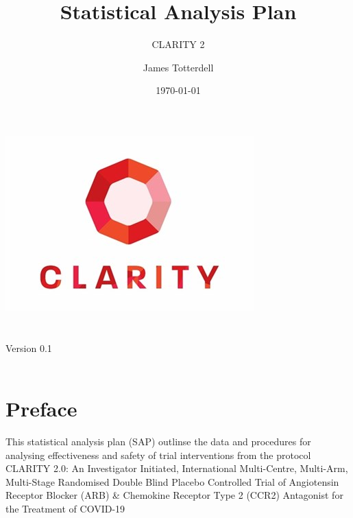 \documentclass[11pt,parskip=half-]{scrartcl}
\begin{document}
\title{Statistical Analysis Plan}
\subtitle{CLARITY 2}
\author{James Totterdell}
\date{\today}
\makeatletter
\begin{titlepage}
    \begin{center}
        \includegraphics[width=0.7\linewidth]{clarity-logo.jpg}\\[4ex]
        {\huge \bfseries  \@title }\\[2ex]
        {\LARGE \bfseries  \@subtitle }\\[2ex]
        {\large Version 0.1}\\[2ex]
        {\large \@date}\\[10ex]
    \end{center}
\end{titlepage}
\makeatother
\thispagestyle{empty}
\newpage

\tableofcontents

\clearpage

\section*{Preface}

This statistical analysis plan (SAP) outlinse the data and procedures for analysing effectiveness and safety of trial interventions from the protocol CLARITY 2.0: An Investigator Initiated, International Multi-Centre, Multi-Arm, Multi-Stage Randomised Double Blind Placebo Controlled Trial of Angiotensin Receptor Blocker (ARB) \& Chemokine Receptor Type 2 (CCR2) Antagonist for the Treatment of COVID-19
\end{document}

